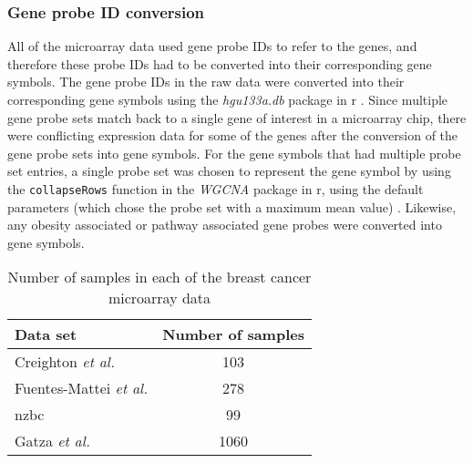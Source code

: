 \subsubsection{Gene probe ID conversion}
\label{ssub:gene_probe_id_conversion}

All of the microarray data used gene probe IDs to refer to the genes, and therefore these probe IDs had to be converted into their corresponding gene symbols.
The gene probe IDs in the raw data were converted into their corresponding gene symbols using the \textit{hgu133a.db} package in \gls{r} \citep{hgu133}.
Since multiple gene probe sets match back to a single gene of interest in a microarray chip, there were conflicting expression data for some of the genes after the conversion of the gene probe sets into gene symbols.
For the gene symbols that had multiple probe set entries, a single probe set was chosen to represent the gene symbol by using the \texttt{collapseRows} function in the \textit{WGCNA} package in \gls{r}, using the default parameters (which chose the probe set with a maximum mean value) \citep{Langfelder2008}.
Likewise, any obesity associated or pathway associated gene probes were converted into gene symbols.

\begin{table}[htpb]
	\centering
	\caption{Number of samples in each of the breast cancer microarray data}
	\label{tab:num_sample_microarray}
	\begin{tabular}{lc}
		Data set & Number of samples\\
		\hline
		\hline
		\rule{0pt}{2.25ex}Creighton \textit{et al.} & 103\\
		Fuentes-Mattei \textit{et al.}              & 278\\
		\gls{nzbc}                                  & 99 \\
		Gatza \textit{et al.}                       & 1060\\
		\hline
		\hline
	\end{tabular}
\end{table}


